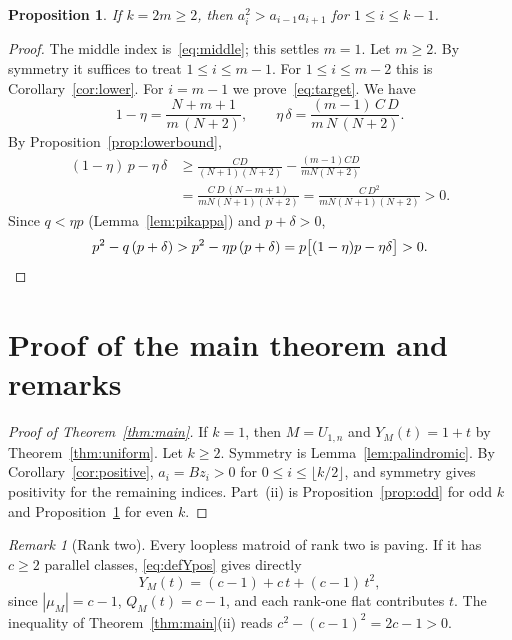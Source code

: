 \documentclass[11pt]{amsart}
\newtheorem{proposition}[theorem]{Proposition}
\theoremstyle{definition}
\theoremstyle{remark}
\newtheorem{remark}[theorem]{Remark}
\numberwithin{equation}{section}
\begin{document}
\begin{proposition}\label{prop:even}
If $k=2m\ge2$, then $a_i^2>a_{i-1}a_{i+1}$ for $1\le i\le k-1$.
\end{proposition}

\begin{proof}
The middle index is~\eqref{eq:middle}; this settles $m=1$. Let $m\ge2$. By symmetry it suffices to treat $1\le i\le m-1$. For $1\le i\le m-2$ this is Corollary~\ref{cor:lower}. For $i=m-1$ we prove~\eqref{eq:target}. We have
\[
1-\eta=\frac{N+m+1}{m\,(N+2)},\qquad \eta\,\delta=\frac{(m-1)\,C\,D}{m\,N\,(N+2)} .
\]
By Proposition~\ref{prop:lowerbound},
\begin{align*}
(1-\eta)\,p-\eta\,\delta&\ge\frac{CD}{(N+1)(N+2)}-\frac{(m-1)CD}{mN(N+2)}\\
&=\frac{C\,D\,(N-m+1)}{mN(N+1)(N+2)}=\frac{C\,D^2}{mN(N+1)(N+2)}>0 .
\end{align*}
Since $q<\eta p$ (Lemma~\ref{lem:pikappa}) and $p+\delta>0$,
\[
p^2-q\,(p+\delta)>p^2-\eta p\,(p+\delta)=p\bigl[(1-\eta)p-\eta\delta\bigr]>0. \qedhere
\]
\end{proof}

\section{Proof of the main theorem and remarks}\label{sec:proof}

\begin{proof}[Proof of Theorem~\ref{thm:main}]
If $k=1$, then $M=U_{1,n}$ and $Y_M(t)=1+t$ by Theorem~\ref{thm:uniform}. Let $k\ge2$. Symmetry is Lemma~\ref{lem:palindromic}. By Corollary~\ref{cor:positive}, $a_i=Bz_i>0$ for $0\le i\le\lfloor k/2\rfloor$, and symmetry gives positivity for the remaining indices. Part~(ii) is Proposition~\ref{prop:odd} for odd $k$ and Proposition~\ref{prop:even} for even $k$.
\end{proof}

\begin{remark}[Rank two]\label{rem:ranktwo}
Every loopless matroid of rank two is paving. If it has $c\ge2$ parallel classes, \eqref{eq:defYpos} gives directly
\[
Y_M(t)=(c-1)+c\,t+(c-1)\,t^2 ,
\]
since $|\mu_M|=c-1$, $Q_M(t)=c-1$, and each rank-one flat contributes $t$. The inequality of Theorem~\ref{thm:main}(ii) reads $c^2-(c-1)^2=2c-1>0$.
\end{remark}
\end{document}
